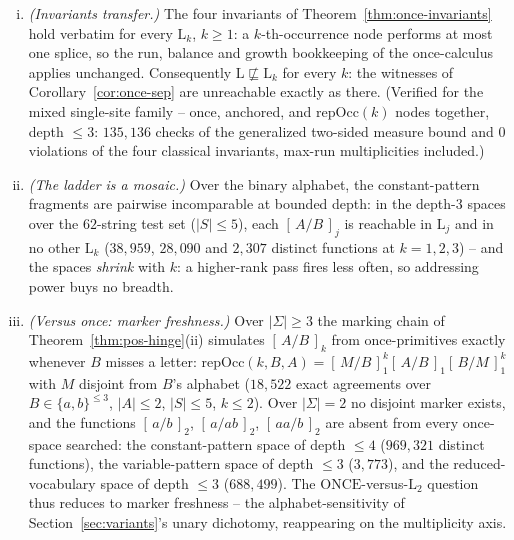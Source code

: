 \begin{proposition}
    \label{prop:kth}
    \begin{enumerate}[(i)]
        \item \emph{(Invariants transfer.)}  The four invariants of
        Theorem~\ref{thm:once-invariants} hold verbatim for every
        $\mathrm{L}_k$, $k \geq 1$: a $k$-th-occurrence node performs
        at most one splice, so the run, balance and growth bookkeeping
        of the once-calculus applies unchanged.  Consequently
        $\mathrm{L} \not\sqsubseteq \mathrm{L}_k$ for every $k$: the
        witnesses of Corollary~\ref{cor:once-sep} are unreachable
        exactly as there.  (Verified for the mixed single-site family --
        once, anchored, and $\mathrm{repOcc}(k)$ nodes together, depth
        $\leq 3$: $135{,}136$ checks of the generalized two-sided
        measure bound and $0$ violations of the four classical
        invariants, max-run multiplicities included.)
        \item \emph{(The ladder is a mosaic.)}  Over the binary
        alphabet, the constant-pattern fragments are pairwise
        incomparable at bounded depth: in the depth-$3$ spaces over the
        $62$-string test set ($|S| \leq 5$), each $[\,A/B\,]_j$ is
        reachable in $\mathrm{L}_j$ and in no other $\mathrm{L}_k$
        ($38{,}959$, $28{,}090$ and $2{,}307$ distinct functions at
        $k = 1, 2, 3$) -- and the spaces \emph{shrink} with $k$: a
        higher-rank pass fires less often, so addressing power buys no
        breadth.
        \item \emph{(Versus once: marker freshness.)}  Over
        $|\Sigma| \geq 3$ the marking chain of
        Theorem~\ref{thm:pos-hinge}(ii) simulates $[\,A/B\,]_k$ from
        once-primitives exactly whenever $B$ misses a letter:
        $\mathrm{repOcc}(k,B,A) =
        [\,M/B\,]_1^{k}[\,A/B\,]_1[\,B/M\,]_1^{k}$ with $M$ disjoint
        from $B$'s alphabet ($18{,}522$ exact agreements over $B \in
        \{a,b\}^{\leq 3}$, $|A| \leq 2$, $|S| \leq 5$, $k \leq 2$).
        Over $|\Sigma| = 2$ no disjoint marker exists, and the functions
        $[\,a/b\,]_2$, $[\,a/ab\,]_2$, $[\,aa/b\,]_2$ are absent from
        every once-space searched: the constant-pattern space of depth
        $\leq 4$ ($969{,}321$ distinct functions), the variable-pattern
        space of depth $\leq 3$ ($3{,}773$), and the reduced-vocabulary
        space of depth $\leq 3$ ($688{,}499$).  The
        $\mathrm{ONCE}$-versus-$\mathrm{L}_2$ question thus reduces to
        marker freshness -- the alphabet-sensitivity of
        Section~\ref{sec:variants}'s unary dichotomy, reappearing on
        the multiplicity axis.
    \end{enumerate}
\end{proposition}

